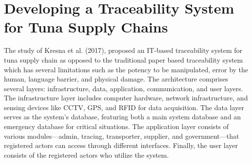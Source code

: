 \section{Developing a Traceability System for Tuna Supply Chains}

The study of Kresna et al. (2017), proposed an IT-based traceability system for tuna supply chain as opposed to the traditional paper based traceability system which has several limitations such as the potency to be manipulated, error by the human, language barrier, and physical damage. The architecture comprises several layers: infrastructure, data, application, communication, and user layers. The infrastructure layer includes computer hardware, network infrastructure, and sensing devices like CCTV, GPS, and RFID for data acquisition. The data layer serves as the system's database, featuring both a main system database and an emergency database for critical situations. The application layer consists of various modules—admin, tracing, transporter, supplier, and government—that registered actors can access through different interfaces. Finally, the user layer consists of the registered actors who utilize the system.

